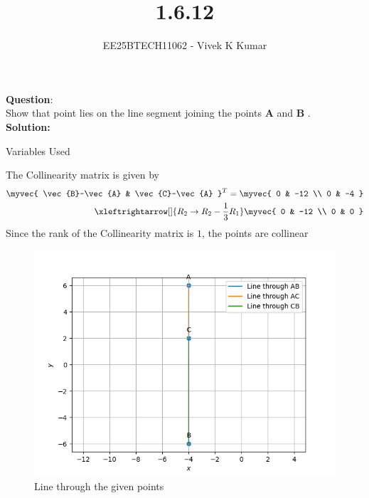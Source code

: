 \documentclass[journal]{IEEEtran}
\title{1.6.12}
\author{EE25BTECH11062 - Vivek K Kumar}
\begin{document}
\maketitle

\renewcommand{\thefigure}{\theenumi}
\renewcommand{\thetable}{\theenumi}


\textbf{Question}:\\
Show that point  lies on the line segment joining the points \textbf{A}  and \textbf{B} .
\\
\textbf{Solution: }
\begin{table}[H]    
  \centering
  
  \caption{Variables Used}
  \label{tab:1.6.12}
\end{table}
The Collinearity matrix is given by\\
\begin{align}
\myvec{
   \vec{B}-\vec{A} & \vec{C}-\vec{A}
 }^T = \myvec{
   0 & -12 \\
   0 & -4
   }\\
 \xleftrightarrow[]{R_2 \rightarrow {R_2-\frac{1}{3}R_1}}
 \myvec{
   0 & -12
   \\
   0 & 0
   }
\end{align}
Since the rank of the Collinearity matrix is $1$, the points are collinear
\begin{figure}[H]
   \centering
  \includegraphics[width=0.64\columnwidth]{figs/fig.png}
   \caption{Line through the given points}
   \label{stemplot}
\end{figure}
\end{document}
